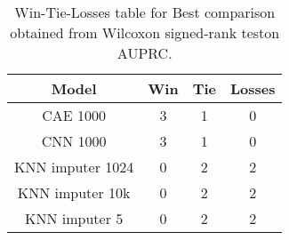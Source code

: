 \begin{table}[H]
\centering
\begin{tabular}{|c|c|c|c|}

   \textbf{Model} &  \textbf{Win} &  \textbf{Tie} &  \textbf{Losses} \\
\hline

         CAE 1000 &             3 &             1 &                0 \\
\hline
         CNN 1000 &             3 &             1 &                0 \\
\hline
 KNN imputer 1024 &             0 &             2 &                2 \\
\hline
  KNN imputer 10k &             0 &             2 &                2 \\
\hline
    KNN imputer 5 &             0 &             2 &                2 \\
\hline

\end{tabular}
\caption{Win-Tie-Losses table for Best comparison obtained from Wilcoxon signed-rank teston AUPRC.}
\label{tab:best_comparison_knn_vs_cae_vs_cnn}
\end{table}